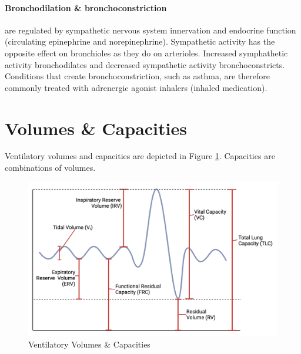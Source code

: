\paragraph{Bronchodilation \& bronchoconstriction} are regulated by sympathetic nervous system innervation and endocrine function (circulating epinephrine and norepinephrine). Sympathetic activity has the opposite effect on bronchioles as they do on arterioles. Increased symphathetic activity bronchodilates and decreased sympathetic activity bronchoconstricts. Conditions that create bronchoconstriction, such as asthma, are therefore commonly treated with adrenergic agonist inhalers (inhaled medication).  

\section{Volumes \& Capacities}

Ventilatory volumes and capacities are depicted in Figure \ref{fig:ventilation_volumes}. Capacities are combinations of volumes.

\begin{figure}[!h]
    \centering
    \includegraphics[width=1.0 \linewidth]{./figure/ventilation_volumes.png}
    \caption{Ventilatory Volumes \& Capacities}
    \label{fig:ventilation_volumes}
\end{figure}

